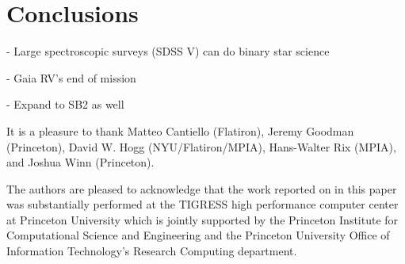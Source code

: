 \documentclass[modern, letterpaper]{aastex62}
\newcommand{\apogee}{\project{\acronym{APOGEE}}}
\newcommand{\sdssiv}{\project{\acronym{SDSS-IV}}}
\begin{document}
\section{Conclusions}

- Large spectroscopic surveys (SDSS V) can do binary star science

- Gaia RV's end of mission

- Expand to SB2 as well


\acknowledgements

It is a pleasure to thank
Matteo Cantiello (Flatiron),
Jeremy Goodman (Princeton),
David W. Hogg (NYU/Flatiron/MPIA),
Hans-Walter Rix (MPIA),
and Joshua Winn (Princeton).

The authors are pleased to acknowledge that the work reported on in this
paper was substantially performed at the TIGRESS high performance computer
center at Princeton University which is jointly supported by the Princeton
Institute for Computational Science and Engineering and the Princeton
University Office of Information Technology's Research Computing department.


\facility{\sdssiv, \apogee}

\clearpage



\end{document}
